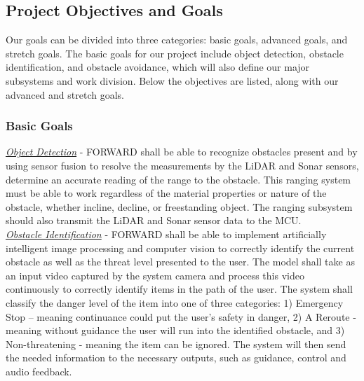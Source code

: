 \subsection{Project Objectives and Goals}
\noindent Our goals can be divided into three categories: basic goals, advanced goals, and stretch goals. The basic goals for our project include object detection, obstacle identification, and obstacle avoidance, which will also define our major subsystems and work division. Below the objectives are listed, along with our advanced and stretch goals.\\

\subsubsection{Basic Goals}
\noindent \underline{\textit{Object Detection}} - FORWARD shall be able to recognize obstacles present and by using sensor fusion to resolve the measurements by the LiDAR and Sonar sensors, determine an accurate reading of the range to the obstacle. This ranging system must be able to work regardless of the material properties or nature of the obstacle, whether incline, decline, or freestanding object. The ranging subsystem should also transmit the LiDAR and Sonar sensor data to the MCU. \\

\noindent \underline{\textit{Obstacle Identification}} - FORWARD shall be able to implement artificially intelligent image processing and computer vision to correctly identify the current obstacle as well as the threat level presented to the user. The model shall take as an input video captured by the system camera and process this video continuously to correctly identify items in the path of the user. The system shall classify the danger level of the item into one of three categories: 1) Emergency Stop – meaning continuance could put the user’s safety in danger, 2) A Reroute - meaning without guidance the user will run into the identified obstacle, and 3) Non-threatening - meaning the item can be ignored. The system will then send the needed information to the necessary outputs, such as guidance, control and audio feedback. \\

